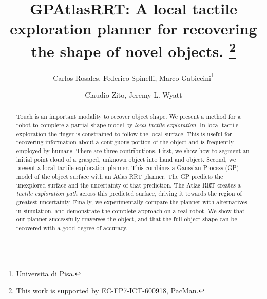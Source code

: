 \documentclass{ws-ijhr}
\begin{document}

%
\catchline{}{}{}{}{}
%

\title{GPAtlasRRT: A local tactile exploration planner for recovering the shape of novel objects.
  \thanks{This work is supported by EC-FP7-ICT-600918, PacMan.}}

\author{Carlos Rosales, Federico Spinelli, Marco Gabiccini\footnote{Universita di Pisa.}}

\address{Centro di Ricerca E. Piaggio, Univ. di Pisa, Pisa, Italy.\\
carlos.rosales@for.unipi.it}

\author{Claudio Zito, Jeremy L. Wyatt}

\address{IRLab, CN-CR, School of Computer Science\\
University of Birmingham, Birmingham, B15 2TT, UK\\
\{C.Zito, J.L.Wyatt\}@cs.bham.ac.uk}

\maketitle

\begin{history}
\end{history}

\begin{abstract}
Touch is an important modality to recover object shape. We present a method for a robot to complete a partial shape model by {\em local tactile exploration}.  In local tactile exploration the finger is constrained to follow the local surface. This is useful for recovering information about a contiguous portion of the object and is frequently employed by humans. There are three contributions. First, we show how to segment an initial point cloud of a grasped, unknown object into hand and object. Second, we present a local tactile exploration planner. This combines a Gaussian Process (GP) model of the object surface with an Atlas RRT planner. The GP predicts the unexplored surface and the uncertainty of that prediction. The Atlas-RRT creates a {\em tactile exploration path} across this predicted surface, driving it towards the region of greatest uncertainty. Finally, we experimentally compare the planner with alternatives in simulation, and demonstrate the complete approach on a real robot. We show that our planner successfully traverses the object, and that the full object shape can be recovered with a good degree of accuracy.


\end{abstract}
\end{document}
